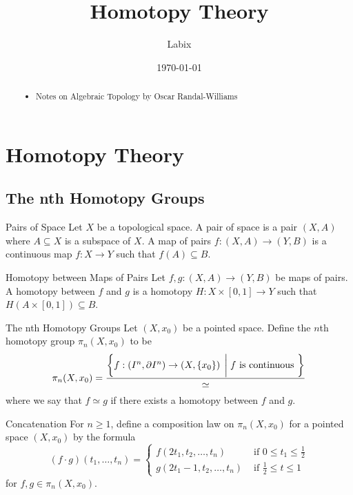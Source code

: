 \documentclass[a4paper]{article}
\title{Homotopy Theory}
\author{Labix}
\date{\today}
\begin{document}
\maketitle
\begin{abstract}
\begin{itemize}
\item Notes on Algebraic Topology by Oscar Randal-Williams
\end{itemize}
\end{abstract}
\pagebreak
\tableofcontents

\pagebreak

\section{Homotopy Theory}
\subsection{The nth Homotopy Groups}
\begin{defn}{Pairs of Space}{} Let $X$ be a topological space. A pair of space is a pair $(X,A)$ where $A\subseteq X$ is a subspace of $X$. A map of pairs $f:(X,A)\to(Y,B)$ is a continuous map $f:X\to Y$ such that $f(A)\subseteq B$. 
\end{defn}

\begin{defn}{Homotopy between Maps of Pairs}{} Let $f,g:(X,A)\to (Y,B)$ be maps of pairs. A homotopy between $f$ and $g$ is a homotopy $H:X\times[0,1]\to Y$ such that $H(A\times[0,1])\subseteq B$. 
\end{defn}

\begin{defn}{The nth Homotopy Groups}{} Let $(X,x_0)$ be a pointed space. Define the $n$th homotopy group $\pi_n(X,x_0)$ to be $$\pi_n(X,x_0)=\frac{\left\{f:\left(I^n,\partial I^n\right)\to\left(X,\{x_0\}\right)\;\bigg{|}\;f \text{ is continuous }\right\}}{\simeq}$$ where we say that $f\simeq g$ if there exists a homotopy between $f$ and $g$. 
\end{defn}

\begin{defn}{Concatenation}{} For $n\geq 1$, define a composition law on $\pi_n(X,x_0)$ for a pointed space $(X,x_0)$ by the formula $$(f\cdot g)(t_1,\dots,t_n)=\begin{cases}
f(2t_1,t_2,\dots,t_n) & \text{ if } 0\leq t_1\leq\frac{1}{2}\\
g(2t_1-1,t_2,\dots,t_n) & \text{ if } \frac{1}{2}\leq t\leq 1
\end{cases}$$ for $f,g\in\pi_n(X,x_0)$. 
\end{defn}
\end{document}
